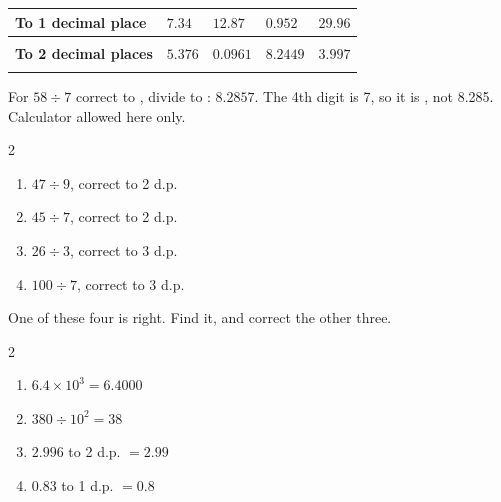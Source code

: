 \documentclass[12pt,a4paper]{article}
\begin{document}
\vspace{2pt}
\noindent
\begin{tabularx}{\textwidth}{|>{\raggedright\arraybackslash}p{3.5cm}|X|X|X|X|}
  \hline
  \textbf{To 1 decimal place} \rule[-0.7em]{0pt}{2.1em} &
    $7.34$ & $12.87$ & $0.952$ & $29.96$ \\ \hline
  \rule[-0.8em]{0pt}{2.2em} & & & & \\ \hline
  \textbf{To 2 decimal places} \rule[-0.7em]{0pt}{2.1em} &
    $5.376$ & $0.0961$ & $8.2449$ & $3.997$ \\ \hline
  \rule[-0.8em]{0pt}{2.2em} & & & & \\ \hline
\end{tabularx}


\begin{remember}
  For $58 \div 7$ correct to , divide to : $8.2857$. The
  4th digit is 7, so it is , not 8.285. \; Calculator allowed here only.
\end{remember}

\vspace{2pt}
\begin{multicols}{2}
\begin{enumerate}[label=(\alph*), itemsep=10pt]
  \item $47 \div 9$, correct to 2 d.p. \hfill \blank[2.4cm]
  \item $45 \div 7$, correct to 2 d.p. \hfill \blank[2.4cm]
  \item $26 \div 3$, correct to 3 d.p. \hfill \blank[2.4cm]
  \item $100 \div 7$, correct to 3 d.p. \hfill \blank[2.4cm]
\end{enumerate}
\end{multicols}


\noindent One of these four is right. Find it, and correct the other three.

\vspace{4pt}
\begin{multicols}{2}
\begin{enumerate}[label=(\alph*), itemsep=10pt]
  \item $6.4 \times 10^3 = 6.4000$ \; \blank[2.4cm]
  \item $380 \div 10^2 = 38$ \; \blank[2.4cm]
  \item $2.996$ to 2 d.p. $= 2.99$ \; \blank[2.4cm]
  \item $0.83$ to 1 d.p. $= 0.8$ \; \blank[2.4cm]
\end{enumerate}
\end{multicols}
\end{document}
